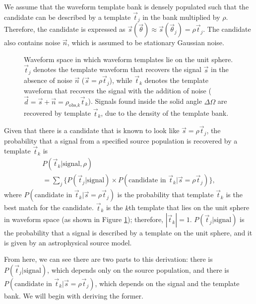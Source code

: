 \documentclass[twocolumn,showpacs,unsortedaddress,superscriptaddress,showkeys,nofootinbib,preprintnumbers,letterpaper]{revtex4-1}
\newcommand{\rhok}{\rho_{\text{obs,$k$}}}
\begin{document}
We assume that the waveform template bank is densely populated such that the candidate can be described by a template $\vec{t}_j$ in the bank multiplied by $\rho$. Therefore, the candidate is expressed as $\vec{s}(\vec\theta) \approx \vec{s}(\vec{\theta}_{j}) = \rho\vec{t}_j$. The candidate also contains noise $\vec{n}$, which is assumed to be stationary Gaussian noise. 
\begin{figure}

\caption{Waveform space in which waveform templates lie on the unit sphere. $\vec{t}_j$ denotes the template waveform that recovers the signal $\vec{s}$ in the absence of noise $\vec{n}$ ($\vec{s}=\rho\vec{t}_j$), while $\vec{t}_k$ denotes the template waveform that recovers the signal with the addition of noise ($\vec{d}=\vec{s}+\vec{n}=\rhok\vec{t}_k$). Signals found inside the solid angle $\Delta\Omega$ are recovered by template $\vec{t}_k$, due to the density of the template bank.}
\label{fig:unitsphere}
\end{figure}

Given that there is a candidate that is known to look like $\vec{s}=\rho\vec{t}_j$, the probability that a signal from a specified source population is recovered by a template $\vec{t}_k$ is
   \begin{multline}
   \label{eqn:prob_signal}
   P(\vec{t}_k | \text{signal},\rho)\\
   = \sum_j \Big\{ P(\vec{t}_j|\text{signal})\times P(\text{candidate in }\vec{t}_k|\vec{s}=\rho\vec{t}_j) \Big\},
   \end{multline}
where $P(\text{candidate in }\vec{t}_k|\vec{s}=\rho\vec{t}_j)$ is the probability that template $\vec{t}_k$ is the best match for the candidate. $\vec{t}_k$ is the $k$th template that lies on the unit sphere in waveform space (as shown in Figure \ref{fig:unitsphere}); therefore, $|\vec{t}_k| = 1$. $P(\vec{t}_j|\text{signal})$ is the probability that a signal is described by a template on the unit sphere, and it is given by an astrophysical source model.
	
From here, we can see there are two parts to this derivation: there is $P(\vec{t}_j|\text{signal})$, which depends only on the source population, and there is $P(\text{candidate in }\vec{t}_k|\vec{s}=\rho\vec{t}_j)$, which depends on the signal and the template bank. We will begin with deriving the former.
\end{document}
